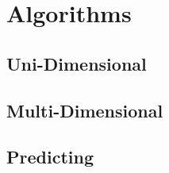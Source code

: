 
\chapter{Algorithms}\label{chapter:algorithms}

\section{Uni-Dimensional}

\section{Multi-Dimensional}

\section{Predicting}
